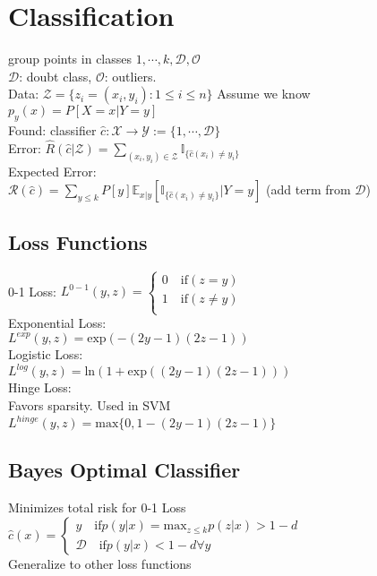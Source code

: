 \section*{Classification}
group points in classes $1,\cdots, k, \mathcal{D}, \mathcal{O}$\\
$\mathcal{D}$: doubt class, $\mathcal{O}$: outliers.\\
Data: $\mathcal{Z}=\{z_i=(x_i,y_i):1\leq i\leq n\}$ 
Assume we know $p_y(x){=}P[X{=}x|Y{=}y]$\\
Found: classifier $\hat{c}:\mathcal{X}{\rightarrow}\mathcal{Y}{:=}\{1,\cdots, \mathcal{D}\}$\\
Error: $\hat{R}(\hat{c}|\mathcal{Z})=\sum_{(x_i,y_i)\in\mathcal{Z}}\mathbb{I}_{\{\hat{c}(x_i)\not=y_i\}}$\\
Expected Error:\\
$\mathcal{R}(\hat{c}) = \sum_{y\leq k}P[y]\mathbb{E}_{x|y}[\mathbb{I}_{\{\hat{c}(x_i)\not=y_i\}}|Y=y]$
(add term from $\mathcal{D}$)


\subsection*{Loss Functions}
0-1 Loss:
$L^{0-1}(y,z) = \begin{cases} 
      0 \quad \mathrm{if } (z=y)\\
      1 \quad \mathrm{if } (z\not=y)\\
   \end{cases}
$\\
Exponential Loss:\\
$L^{exp}(y,z)=\mathrm{exp}(-(2y-1)(2z-1))$\\
Logistic Loss:\\
$L^{log}(y,z)=\mathrm{ln}(1+\mathrm{exp}((2y-1)(2z-1)))$\\
Hinge Loss:\\
Favors sparsity. Used in SVM\\
$L^{hinge}(y,z)=\mathrm{max}\{0,1-(2y-1)(2z-1)\}$


\subsection*{Bayes Optimal Classifier}
Minimizes total risk for 0-1 Loss\\
$\hat{c}(x){=}
\begin{cases} 
      y \quad \mathrm{if} p(y|x){=}\mathrm{max}_{z \leq k}p(z|x){>}{1-d}\\
      \mathcal{D} \quad \mathrm{if}  p(y|x)<1-d\forall y
   \end{cases}
$\\
Generalize to other loss functions

